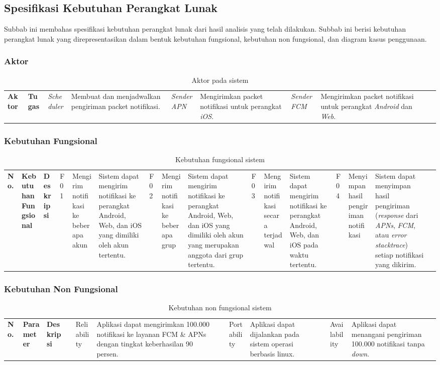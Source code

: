 \subsection{Spesifikasi Kebutuhan Perangkat Lunak}
Subbab ini membahas spesifikasi kebutuhan perangkat lunak dari hasil analisis yang telah dilakukan.
Subbab ini berisi kebutuhan perangkat lunak yang direpresentasikan dalam bentuk kebutuhan fungsional, kebutuhan non fungsional, dan diagram kasus penggunaan.

\subsubsection{Aktor}
\begin{longtable}{|p{2cm}|p{6cm}|}
    \hline
    \textbf{Aktor} & \textbf{Tugas} & \hline
    \textit{Scheduler} & Membuat dan menjadwalkan pengiriman packet notifikasi. & \hline
    \textit{Sender APN} & Mengirimkan packet notifikasi untuk perangkat \textit{iOS}. & \hline
    \textit{Sender FCM} & Mengirimkan packet notifikasi untuk perangkat \textit{Android} dan \textit{Web}. & \hline
    \caption{Aktor pada sistem}
\end{longtable}

\subsubsection{Kebutuhan Fungsional}
\begin{longtable}{|p{2.5cm}|p{2cm}|p{4.5cm}|}
    \hline
    \textbf{No.} & \textbf{Kebutuhan Fungsional} & \textbf{Deskripsi} & \hline
    F01 & Mengirim notifikasi ke beberapa akun & Sistem dapat mengirim notifikasi ke perangkat Android, Web, dan iOS yang dimiliki oleh akun tertentu. & \hline
    F02 & Mengirim notifikasi ke beberapa grup & Sistem dapat mengirim notifikasi ke perangkat Android, Web, dan iOS yang dimiliki oleh akun yang merupakan anggota dari grup tertentu. & \hline
    F03 & Mengirim notifikasi secara terjadwal & Sistem dapat mengirim notifikasi ke perangkat Android, Web, dan iOS pada waktu tertentu. & \hline
    F04 & Menyimpan hasil pengiriman notifikasi & Sistem dapat menyimpan hasil pengiriman (\textit{response} dari \textit{APNs}, \textit{FCM}, atau \textit{error stacktrace}) setiap notifikasi yang dikirim. & \hline
    \caption{Kebutuhan fungsional sistem}
\end{longtable}

\subsubsection{Kebutuhan Non Fungsional}
\begin{longtable}{|p{0.5cm}|p{2cm}|p{5.5cm}|}
    \hline
    \textbf{No.} & \textbf{Parameter} & \textbf{Deskripsi} &  & Reliability & Aplikasi dapat mengirimkan 100.000 notifikasi ke layanan FCM \& APNs dengan tingkat keberhasilan 90 persen. &  & Portability & Aplikasi dapat dijalankan pada sistem operasi berbasis linux. &  & Availability & Aplikasi dapat menangani pengiriman 100.000 notifikasi tanpa \textit{down}. & \hline
    \caption{Kebutuhan non fungsional sistem}
\end{longtable}

